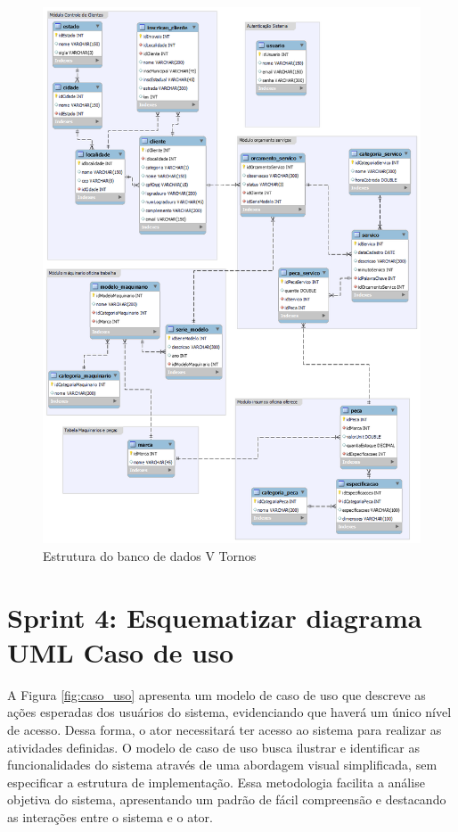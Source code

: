 \begin{figure}[ht!]
\centering
\includegraphics[width=0.76\linewidth]{figs/base_dados_firma.png}
\caption{Estrutura do banco de dados V Tornos}
\label{fig:banco_dados}
\end{figure}

\section{Sprint 4: Esquematizar diagrama UML Caso de uso}
\label{sec:esquematizar_uml}

A Figura \ref{fig:caso_uso} apresenta um modelo de caso de uso que descreve as ações esperadas dos usuários do sistema, evidenciando que haverá um único nível de acesso. Dessa forma, o ator necessitará ter acesso ao sistema para realizar as atividades definidas. O modelo de caso de uso busca ilustrar e identificar as funcionalidades do sistema através de uma abordagem visual simplificada, sem especificar a estrutura de implementação. Essa metodologia facilita a análise objetiva do sistema, apresentando um padrão de fácil compreensão e destacando as interações entre o sistema e o ator.


